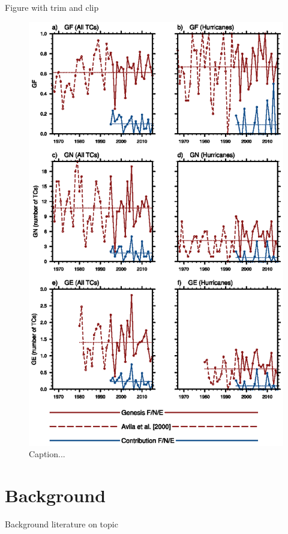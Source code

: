 Figure with trim and clip
\begin{figure}[htp]
\centering
\includegraphics[trim={4cm 8.5cm 3cm 0cm},clip,width=\textwidth]{Chapter-1/figs/gfgnge_vs_year.eps}
\caption{Caption...}
\label{fig:gfgn}
\end{figure}

\section{Background}
\label{sec:back}

Background literature on topic

